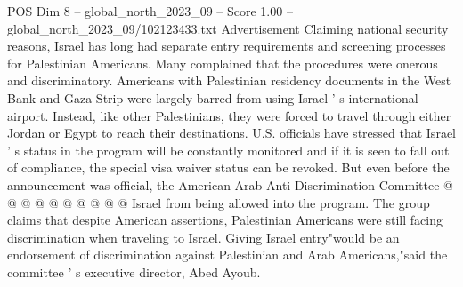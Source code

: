 \begin{textsample}{POS Dim 8 – global\_north\_2023\_09 – Score 1.00 – global\_north\_2023\_09/102123433.txt}
Advertisement Claiming national security reasons, Israel has long had separate entry requirements and screening processes for Palestinian Americans.
Many complained that the procedures were onerous and discriminatory.
Americans with Palestinian residency documents in the West Bank and Gaza Strip were largely barred from using Israel ' s international airport.
Instead, like other Palestinians, they were forced to travel through either Jordan or Egypt to reach their destinations.
U.S. officials have stressed that Israel ' s status in the program will be constantly monitored and if it is seen to fall out of compliance, the special visa waiver status can be revoked.
But even before the announcement was official, the American-Arab Anti-Discrimination Committee @ @ @ @ @ @ @ @ @ @ Israel from being allowed into the program.
The group claims that despite American assertions, Palestinian Americans were still facing discrimination when traveling to Israel.
Giving Israel entry"would be an endorsement of discrimination against Palestinian and Arab Americans,"said the committee ' s executive director, Abed Ayoub.

\end{textsample}
